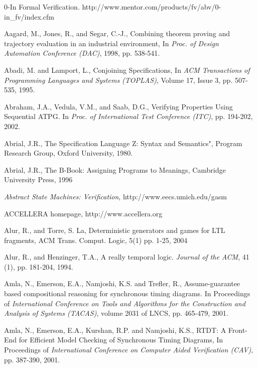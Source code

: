 {\small
\begin{thebibliography}{99}

 0-In Formal Verification. 
	http://www.mentor.com/products/fv/abv/0-in\_fv/index.cfm

 Aagard, M., Jones, R., and Segar, C.-J., Combining
        theorem proving and trajectory evaluation in an industrial
        environment, In {\em Proc. of Design Automation Conference (DAC)}, 
	1998, pp. 538-541.

 Abadi, M. and Lamport, L., Conjoining Specifications,
	In {\em ACM Transactions of Programming Languages and Systems
	(TOPLAS)}, Volume 17, Issue 3, pp. 507-535, 1995.

  Abraham, J.A., Vedula, V.M., and Saab, D.G., Verifying
	Properties Using Sequential ATPG. In {\em Proc. of International
        Test Conference (ITC)}, pp. 194-202, 2002.

 Abrial, J.R., The Specification Language Z: Syntax and 
		Semantics", Program Research Group, Oxford University, 1980.

 Abrial, J.R., The B-Book: Assigning Programs to Meanings, 
		Cambridge University Press, 1996

 {\em Abstract State Machines: Verification},
        http://www.eecs.umich.edu/gasm 

 ACCELLERA homepage, http://www.accellera.org

 Alur, R., and Torre, S. La, Deterministic
    generators and games for LTL fragments, ACM
    Trans. Comput. Logic, 5(1) pp. 1-25, 2004

 Alur, R., and Henzinger, T.A., A really temporal logic.
	{\em Journal of the ACM}, 41 (1), pp. 181-204, 1994.

 Amla, N., Emerson, E.A., Namjoshi, K.S. and Trefler, R.,
        Assume-guarantee based compositional reasoning for synchronous
        timing diagrams. In Proceedings of
        {\em International Conference on Tools and Algorithms for the
        Construction and Analysis of Systems (TACAS)}, volume 2031 of LNCS,
        pp. 465-479, 2001.

 Amla, N., Emerson, E.A., Kurshan, R.P. and Namjoshi, K.S.,
        RTDT: A Front-End for Efficient Model Checking of Synchronous
        Timing Diagrams,
        In Proceedings of {\em International Conference on Computer Aided
        Verification (CAV)}, pp. 387-390, 2001. 


\end{thebibliography}}
